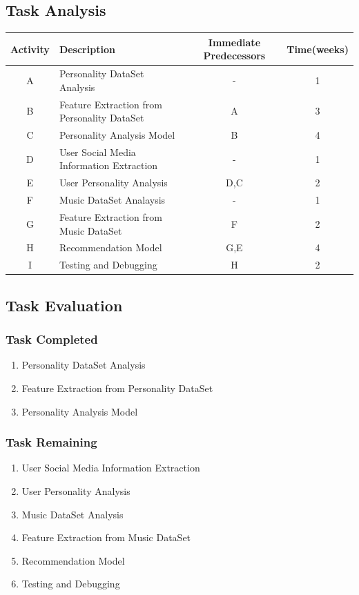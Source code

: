 \documentclass[a4paper, 12pt, onepage]{article}
\begin{document}
	\subsection{Task Analysis}
	\begin{center}
		\begin{tabular}{|c|l|c|c|}
			\hline
				Activity & Description & Immediate Predecessors&Time(weeks)\\
			\hline
			A&Personality DataSet Analysis&-&1\\
			\hline
			B&Feature Extraction from Personality DataSet&A&3\\
			\hline
			C&Personality Analysis Model&B&4\\
			\hline
			D&User Social Media Information Extraction&-&1\\
			\hline
			E&User Personality Analysis&D,C&2\\
			\hline
			F&Music DataSet Analaysis&-&1 \\
			\hline
			G&Feature Extraction from Music DataSet&F&2\\
			\hline
			H&Recommendation Model&G,E&4\\
			\hline
			I&Testing and Debugging&H&2\\
			\hline

		\end{tabular}
	\end{center}
	\cleardoublepage
	\subsection{Task Evaluation}
		\subsubsection{Task Completed}
		\begin{enumerate}
		\item Personality DataSet Analysis
		\item Feature Extraction from Personality DataSet
		\item Personality Analysis Model
		\end{enumerate}

		\subsubsection{Task Remaining}
		\begin{enumerate}
		\item User Social Media Information Extraction
		\item User Personality Analysis
		\item Music DataSet Analysis
		\item Feature Extraction from Music DataSet
		\item Recommendation Model
		\item Testing and Debugging
		\end{enumerate}
\end{document}
